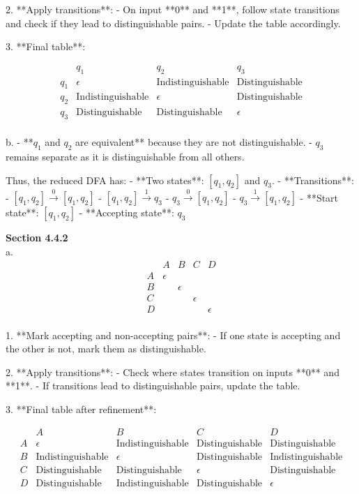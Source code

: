 \documentclass{article}
\theoremstyle{theorem}
\theoremstyle{definition}
\theoremstyle{remark}
\begin{document}
2. **Apply transitions**:  
    - On input **0** and **1**, follow state transitions and check if they lead to distinguishable pairs.
    - Update the table accordingly.

3. **Final table**:

\[
\begin{array}{c|ccccc}
    & q_1 & q_2 & q_3 \\
\hline
q_1 & \epsilon & \text{Indistinguishable} & \text{Distinguishable} \\
q_2 & \text{Indistinguishable} & \epsilon & \text{Distinguishable} \\
q_3 & \text{Distinguishable} & \text{Distinguishable} & \epsilon \\
\end{array}
\]

b. 
- **\( q_1 \) and \( q_2 \) are equivalent** because they are not distinguishable.
- \( q_3 \) remains separate as it is distinguishable from all others.

Thus, the reduced DFA has:
- **Two states**: \( [q_1, q_2] \) and \( q_3 \).
- **Transitions**:
  - \( [q_1, q_2] \xrightarrow{0} [q_1, q_2] \)
  - \( [q_1, q_2] \xrightarrow{1} q_3 \)
  - \( q_3 \xrightarrow{0} [q_1, q_2] \)
  - \( q_3 \xrightarrow{1} [q_1, q_2] \)
- **Start state**: \( [q_1, q_2] \)
- **Accepting state**: \( q_3 \)


\textbf{Section 4.4.2} \\
a. 
\[
\begin{array}{c|cccc}
    & A & B & C & D \\
\hline
A & \epsilon &  &  &  \\
B &  & \epsilon &  &  \\
C &  &  & \epsilon &  \\
D &  &  &  & \epsilon \\
\end{array}
\]

1. **Mark accepting and non-accepting pairs**:  
   - If one state is accepting and the other is not, mark them as distinguishable.

2. **Apply transitions**:  
   - Check where states transition on inputs **0** and **1**.
   - If transitions lead to distinguishable pairs, update the table.

3. **Final table after refinement**:

\[
\begin{array}{c|cccc}
    & A & B & C & D \\
\hline
A & \epsilon & \text{Indistinguishable} & \text{Distinguishable} & \text{Distinguishable} \\
B & \text{Indistinguishable} & \epsilon & \text{Distinguishable} & \text{Indistinguishable} \\
C & \text{Distinguishable} & \text{Distinguishable} & \epsilon & \text{Distinguishable} \\
D & \text{Distinguishable} & \text{Indistinguishable} & \text{Distinguishable} & \epsilon \\
\end{array}
\]
\end{document}
